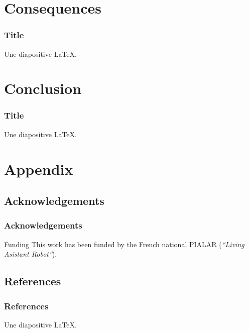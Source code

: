 \documentclass[10pt,c]{beamer}
\begin{document}

\section{Consequences}

\begin{frame}
\frametitle{Title}
Une diapositive \LaTeX.
\end{frame}


\section{Conclusion}

\begin{frame}
\frametitle{Title}
Une diapositive \LaTeX.
\end{frame}


\appendix


\section{Appendix}

\subsection{Acknowledgements}

\begin{frame}
\frametitle{Acknowledgements}
\begin{block}{Funding}
This work has been funded by the French national PIA\footnotemark[1]
LAR (\textit{``Living Asistant Robot''}).
\end{block}
\end{frame}

\subsection{References}

\begin{frame}
\frametitle{References}
Une diapositive \LaTeX.
\end{frame}


\end{document}
